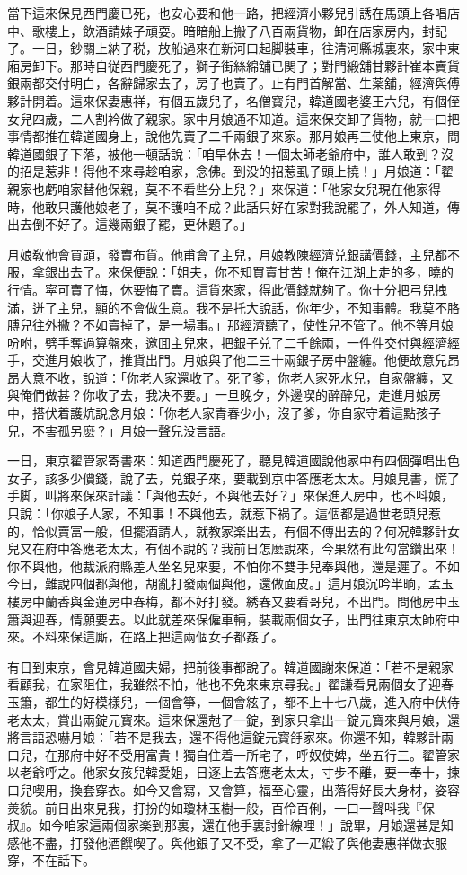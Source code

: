 當下這來保見西門慶已死，也安心要和他一路，把經濟小夥兒引誘在馬頭上各唱店中、歌樓上，飲酒請婊子頑耍。暗暗船上搬了八百兩貨物，卸在店家房内，封記了。一日，鈔關上納了税，放船過來在新河口起脚裝車，往清河縣城裏來，家中東廂房卸下。那時自従西門慶死了，獅子街絲綿舖已関了；對門緞舖甘夥計崔本賣貨銀兩都交付明白，各辭歸家去了，房子也賣了。止有門首解當、生薬舖，經濟與傅夥計開着。這來保妻惠祥，有個五歲兒子，名僧寳兒，韓道國老婆王六兒，有個侄女兒四歲，二人割衿做了親家。家中月娘通不知道。這來保交卸了貨物，就一口把事情都推在韓道國身上，說他先賣了二千兩銀子來家。那月娘再三使他上東京，問韓道國銀子下落，被他一頓話說：「咱早休去！一個太師老爺府中，誰人敢到？沒的招是惹非！得他不來尋趁咱家，念佛。到没的招惹虱子頭上撓！」月娘道：「翟親家也虧咱家替他保親，莫不不看些分上兒？」來保道：「他家女兒現在他家得時，他敢只護他娘老子，莫不護咱不成？此話只好在家對我說罷了，外人知道，傳出去倒不好了。這幾兩銀子罷，更休題了。」

月娘敎他會買頭，發賣布貨。他甫會了主兒，月娘教陳經濟兑銀講價錢，主兒都不服，拿銀出去了。來保便說：「姐夫，你不知買賣甘苦！俺在江湖上走的多，曉的行情。寜可賣了悔，休要悔了賣。這貨來家，得此價錢就夠了。你十分把弓兒拽滿，迸了主兒，顯的不會做生意。我不是托大說話，你年少，不知事體。我莫不胳膊兒往外撇？不如賣掉了，是一場事。」那經濟聽了，使性兒不管了。他不等月娘吩咐，劈手奪過算盤來，邀囬主兒來，把銀子兑了二千餘兩，一件件交付與經濟經手，交進月娘收了，推貨出門。月娘與了他二三十兩銀子房中盤纏。他便故意兒昂昂大意不收，說道：「你老人家還收了。死了爹，你老人家死水兒，自家盤纏，又與俺們做甚？你收了去，我决不要。」一旦晚夕，外邊喫的醉醉兒，走進月娘房中，搭伏着護炕說念月娘：「你老人家青春少小，沒了爹，你自家守着這點孩子兒，不害孤另麽？」月娘一聲兒没言語。

一日，東京翟管家寄書來：知道西門慶死了，聽見韓道國說他家中有四個彈唱出色女子，該多少價錢，說了去，兑銀子來，要載到京中答應老太太。月娘見書，慌了手脚，叫將來保來計議：「與他去好，不與他去好？」來保進入房中，也不呌娘，只說：「你娘子人家，不知事！不與他去，就惹下祸了。這個都是過世老頭兒惹的，恰似賣富一般，但擺酒請人，就教家楽出去，有個不傳出去的？何况韓夥計女兒又在府中答應老太太，有個不說的？我前日怎麽說來，今果然有此勾當鑽出來！你不與他，他裁派府縣差人坐名兒來要，不怕你不雙手兒奉與他，還是遲了。不如今日，難說四個都與他，胡亂打發兩個與他，還做面皮。」這月娘沉吟半晌，孟玉樓房中蘭香與金蓮房中春梅，都不好打發。綉春又要看哥兒，不出門。問他房中玉簫與迎春，情願要去。以此就差來保僱車輛，裝載兩個女子，出門往東京太師府中來。不料來保這廝，在路上把這兩個女子都姦了。

有日到東京，會見韓道國夫婦，把前後事都說了。韓道國謝來保道：「若不是親家看顧我，在家阻住，我雖然不怕，他也不免來東京尋我。」翟謙看見兩個女子迎春玉簫，都生的好模樣兒，一個會箏，一個會絃子，都不上十七八歲，進入府中伏侍老太太，賞出兩錠元寳來。這來保還尅了一錠，到家只拿出一錠元寳來與月娘，還將言語恐嚇月娘：「若不是我去，還不得他這錠元寳㧱家來。你還不知，韓夥計兩口兒，在那府中好不受用富貴！獨自住着一所宅子，呼奴使婢，坐五行三。翟管家以老爺呼之。他家女孩兒韓愛姐，日逐上去答應老太太，寸步不離，要一奉十，揀口兒喫用，換套穿衣。如今又會冩，又會算，福至心靈，出落得好長大身材，姿容羙貌。前日出來見我，打扮的如瓊林玉樹一般，百伶百俐，一口一聲呌我『保叔』。如今咱家這兩個家楽到那裏，還在他手裏討針線哩！」說畢，月娘還甚是知感他不盡，打發他酒饌喫了。與他銀子又不受，拿了一疋緞子與他妻惠祥做衣服穿，不在話下。

